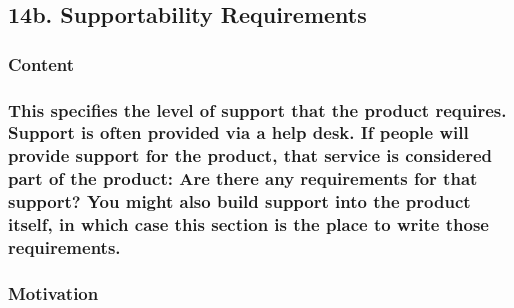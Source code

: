 \documentclass[
]{article}
\begin{document}
\hypertarget{b.-supportability-requirements}{%
\subsection{14b. Supportability
Requirements}\label{b.-supportability-requirements}}

\hypertarget{content-50}{%
\subsubsection{Content}\label{content-50}}

\hypertarget{this-specifies-the-level-of-support-that-the-product-requires.-support-is-often-provided-via-a-help-desk.-if-people-will-provide-support-for-the-product-that-service-is-considered-part-of-the-product-are-there-any-requirements-for-that-support-you-might-also-build-support-into-the-product-itself-in-which-case-this-section-is-the-place-to-write-those-requirements.}{%
\subsubsection{\texorpdfstring{This specifies the level of support that
the product requires. Support is often provided via a help desk. If
people will provide support for the product, that service is considered
part of the product: Are there any requirements for that support? You
might also build support into the product itself, in which case this
section is the place to write those requirements.
}{This specifies the level of support that the product requires. Support is often provided via a help desk. If people will provide support for the product, that service is considered part of the product: Are there any requirements for that support? You might also build support into the product itself, in which case this section is the place to write those requirements. }}\label{this-specifies-the-level-of-support-that-the-product-requires.-support-is-often-provided-via-a-help-desk.-if-people-will-provide-support-for-the-product-that-service-is-considered-part-of-the-product-are-there-any-requirements-for-that-support-you-might-also-build-support-into-the-product-itself-in-which-case-this-section-is-the-place-to-write-those-requirements.}}

\hypertarget{motivation-49}{%
\subsubsection{Motivation}\label{motivation-49}}
\end{document}
